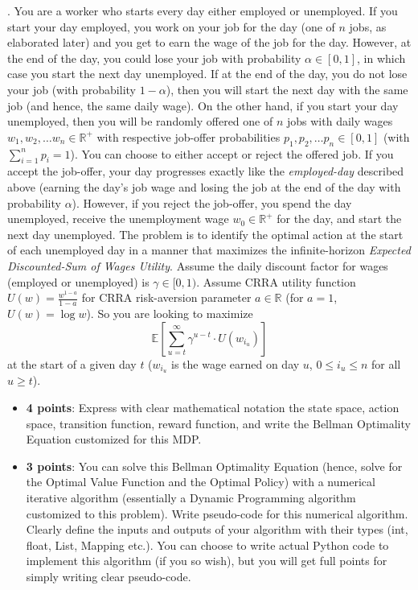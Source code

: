 \documentclass[12pt]{exam}
\begin{document}
\begin{questions}
\pagebreak

\vspace{3mm}
. You are a worker who starts every day either employed or unemployed. If you start your day employed, you work on your job for the day (one of $n$ jobs, as elaborated later) and you get to earn the wage of the job for the day. However, at the end of the day, you could lose your job with probability $\alpha \in [0,1]$, in which case you start the next day unemployed. If at the end of the day, you do not lose your job (with probability $1-\alpha$), then you will start the next day with the same job (and hence, the same daily wage). On the other hand, if you start your day unemployed, then you will be randomly offered one of $n$ jobs with daily wages $w_1, w_2, \ldots w_n \in \mathbb{R}^+$ with respective job-offer probabilities $p_1, p_2, \ldots p_n \in [0,1]$ (with $\sum_{i=1}^n p_i = 1$). You can choose to either accept or reject the offered job. If you accept the job-offer, your day progresses exactly like the {\em employed-day} described above (earning the day's job wage and losing the job at the end of the day with probability $\alpha$). However, if you reject the job-offer, you spend the day unemployed, receive the unemployment wage $w_0 \in \mathbb{R}^+$ for the day, and start the next day unemployed. The problem is to identify the optimal action at the start of each unemployed day in a manner that maximizes the infinite-horizon {\em Expected Discounted-Sum of Wages Utility}. Assume the daily discount factor for wages (employed or unemployed) is $\gamma \in [0,1)$. Assume CRRA utility function $U(w) = \frac {w^{1-a}} {1-a}$ for CRRA risk-aversion parameter $a \in \mathbb{R}$ (for $a=1$, $U(w) = \log w$). So you are looking to maximize
$$\mathbb{E}[\sum_{u=t}^\infty \gamma^{u-t} \cdot U(w_{i_u})]$$
 at the start of a given day $t$ ($w_{i_u}$ is the wage earned on day $u$, $0\leq i_u \leq n$ for all $u\geq t$).

\begin{itemize}
\item {\bf 4 points}: Express with clear mathematical notation the state space, action space, transition function, reward function, and write the Bellman Optimality Equation customized for this MDP.

\item {\bf 3 points}: You can solve this Bellman Optimality Equation (hence, solve for the Optimal Value Function and the Optimal Policy) with a numerical iterative algorithm (essentially a Dynamic Programming algorithm customized to this problem). Write pseudo-code for this numerical algorithm. Clearly define the inputs and outputs of your algorithm with their types (int, float, List, Mapping etc.). You can choose to write actual Python code to implement this algorithm (if you so wish), but you will get full points for simply writing clear pseudo-code.


\end{itemize}
\end{questions}
\end{document}
